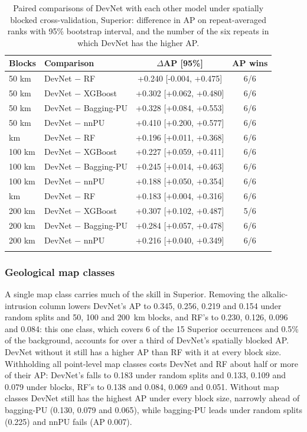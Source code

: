 \documentclass[pdflatex,sn-apa]{sn-jnl}
\begin{document}
\begin{table}[t]
\caption{Paired comparisons of DevNet with each other model under spatially blocked cross-validation, Superior: difference in AP on repeat-averaged ranks with 95\% bootstrap interval, and the number of the six repeats in which DevNet has the higher AP.}\label{tab:spatial-boot}
\footnotesize
\begin{tabular*}{\textwidth}{@{\extracolsep\fill}llcc}
\toprule
Blocks & Comparison & $\Delta$AP [95\%] & AP wins \\
\midrule
50 km & DevNet $-$ RF & +0.240 [-0.004, +0.475] & 6/6 \\
50 km & DevNet $-$ XGBoost & +0.302 [+0.062, +0.480] & 6/6 \\
50 km & DevNet $-$ Bagging-PU & +0.328 [+0.084, +0.553] & 6/6 \\
50 km & DevNet $-$ nnPU & +0.410 [+0.200, +0.577] & 6/6 \\
\addlinespace
100 km & DevNet $-$ RF & +0.196 [+0.011, +0.368] & 6/6 \\
100 km & DevNet $-$ XGBoost & +0.227 [+0.059, +0.411] & 6/6 \\
100 km & DevNet $-$ Bagging-PU & +0.245 [+0.014, +0.463] & 6/6 \\
100 km & DevNet $-$ nnPU & +0.188 [+0.050, +0.354] & 6/6 \\
\addlinespace
200 km & DevNet $-$ RF & +0.183 [+0.004, +0.316] & 6/6 \\
200 km & DevNet $-$ XGBoost & +0.307 [+0.102, +0.487] & 5/6 \\
200 km & DevNet $-$ Bagging-PU & +0.284 [+0.057, +0.478] & 6/6 \\
200 km & DevNet $-$ nnPU & +0.216 [+0.040, +0.349] & 6/6 \\
\botrule
\end{tabular*}
\end{table}

\subsubsection{Geological map classes}\label{sec:res-featuresets}

A single map class carries much of the skill in Superior. Removing the alkalic-intrusion column lowers DevNet's AP to 0.345, 0.256, 0.219 and 0.154 under random splits and 50, 100 and 200~km blocks, and RF's to 0.230, 0.126, 0.096 and 0.084: this one class, which covers 6 of the 15 Superior occurrences and 0.5\% of the background, accounts for over a third of DevNet's spatially blocked AP. DevNet without it still has a higher AP than RF with it at every block size. Withholding all point-level map classes costs DevNet and RF about half or more of their AP: DevNet's falls to 0.183 under random splits and 0.133, 0.109 and 0.079 under blocks, RF's to 0.138 and 0.084, 0.069 and 0.051. Without map classes DevNet still has the highest AP under every block size, narrowly ahead of bagging-PU (0.130, 0.079 and 0.065), while bagging-PU leads under random splits (0.225) and nnPU fails (AP 0.007).
\end{document}
